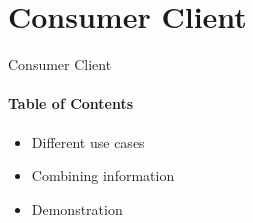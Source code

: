 \section{Consumer Client}
\author{Kasper}

\begin{frame}{Consumer Client}
    \framesubtitle{Table of Contents}

    \begin{itemize}
        \item Different use cases
        \item Combining information
        \item Demonstration
    \end{itemize}
\end{frame}

